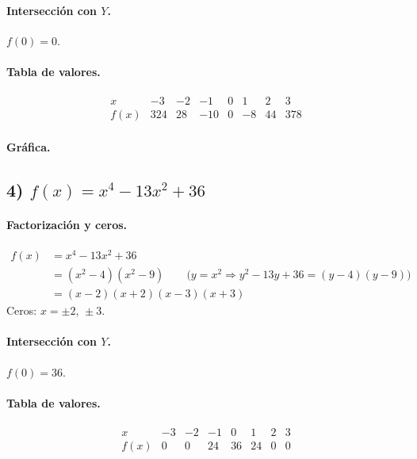 \documentclass[12pt,a4paper]{article}
\begin{document}
	\paragraph{Intersección con \(Y\).} \(f(0)=0\).
	
	\paragraph{Tabla de valores.}
	\[
	\begin{array}{c|rrrrrrr}
		x & -3 & -2 & -1 & 0 & 1 & 2 & 3\\\hline
		f(x) & 324 & 28 & -10 & 0 & -8 & 44 & 378
	\end{array}
	\]
	
	\paragraph{Gráfica.}
	
	\bigskip
	
	\subsection*{4) \(f(x)=x^{4}-13x^{2}+36\)}
	\paragraph{Factorización y ceros.}
	\begin{align*}
		f(x) &= x^{4}-13x^{2}+36\\
		&= (x^{2}-4)(x^{2}-9) \qquad \text{(\(y=x^{2}\Rightarrow y^{2}-13y+36=(y-4)(y-9)\))}\\
		&= (x-2)(x+2)(x-3)(x+3)
	\end{align*}
	Ceros: \(x=\pm 2,\,\pm 3\).
	
	\paragraph{Intersección con \(Y\).} \(f(0)=36\).
	
	\paragraph{Tabla de valores.}
	\[
	\begin{array}{c|rrrrrrr}
		x & -3 & -2 & -1 & 0 & 1 & 2 & 3\\\hline
		f(x) & 0 & 0 & 24 & 36 & 24 & 0 & 0
	\end{array}
	\]
	
\end{document}
